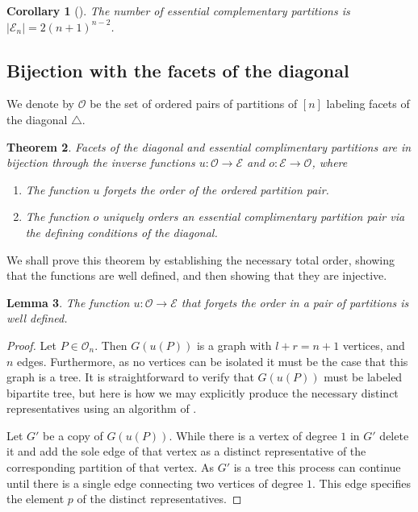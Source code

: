 \documentclass[11pt]{amsart}
\newtheorem{thm}{Theorem}[section]
\newtheorem{corollary}[thm]{Corollary}
\newtheorem{lemma}[thm]{Lemma}
\theoremstyle{definition}
\theoremstyle{remark}
\numberwithin{equation}{section}
\newcommand{\EC}{\mathcal{E}} %
\newcommand{\OP}{\mathcal{O}} %
\newcommand{\0}{\color{blue}{\mathsf{0}}}
\begin{document}
\begin{corollary}[\cite{kajitani1982number}]
The number of essential complementary partitions is $|\EC_n| = 2(n+1)^{n-2}$.
\end{corollary}

\subsection{Bijection with the facets of the diagonal}

We denote by $\OP$ be the set of ordered pairs of partitions of $[n]$ labeling facets of the diagonal $\triangle$.

\begin{thm}
Facets of the diagonal and essential complimentary partitions are in bijection through the inverse functions $u:\OP \to \EC$ and $o:\EC\to \OP$, where
\begin{enumerate}
    \item The function $u$ forgets the order of the ordered partition pair.
    \item The function $o$ uniquely orders an essential complimentary partition pair via the defining conditions of the diagonal. 
\end{enumerate}
\end{thm}
We shall prove this theorem by establishing the necessary total order, showing that the functions are well defined, and then showing that they are injective.

\begin{lemma} 
\label{u well defined}
The function $u:\OP \to \EC$ that forgets the order in a pair of partitions is well defined.
\end{lemma}
\begin{proof}
Let $P \in \OP_n$. Then $G(u(P))$ is a graph with $l+r=n+1$ vertices, and $n$ edges. Furthermore, as no vertices can be isolated it must be the case that this graph is a tree. 
It is straightforward to verify that $G(u(P))$ must be labeled bipartite tree, but here is how we may explicitly produce the necessary distinct representatives using an algorithm of \cite[Theorem 2]{kajitani1982number}.

Let $G'$ be a copy of $G(u(P))$. 
While there is a vertex of degree $1$ in $G'$ delete it and add the sole edge of that vertex as a distinct representative of the corresponding partition of that vertex. 
As $G'$ is a tree this process can continue until there is a single edge connecting two vertices of degree $1$. 
This edge specifies the element $p$ of the distinct representatives.
\end{proof}
\end{document}
